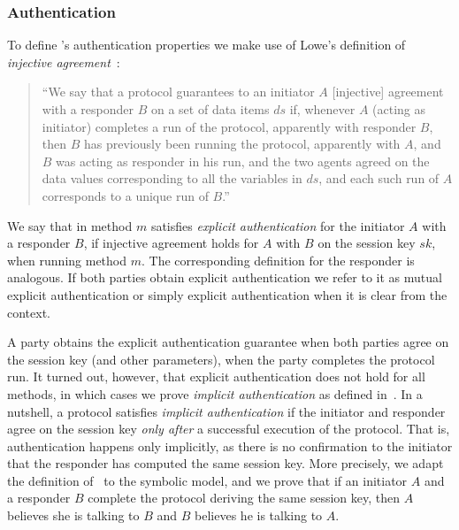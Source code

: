 \spacehack
\subsubsection{Authentication}
To define \mEdhoc{}'s authentication properties we make use of Lowe's definition
of \emph{injective agreement}~\cite{DBLP:conf/csfw/Lowe97a}:
\begin{quote}
  ``We say that a protocol guarantees to an initiator $A$ [injective] agreement
  with a responder $B$ on a set of data items $ds$ if, whenever $A$ (acting as
  initiator) completes a run of the protocol, apparently with responder $B$,
  then $B$ has previously been running the protocol, apparently with $A$, and
  $B$ was acting as responder in his run, and the two agents agreed on the data
  values corresponding to all the variables in $ds$, and each such run of $A$
  corresponds to a unique run of $B$.''
\end{quote}
%
We say that \mEdhoc{} in method $m$ satisfies \emph{explicit authentication} for
the initiator $A$ with a responder $B$, if injective agreement holds for $A$
with $B$ on the session key $sk$, when running method $m$.
%
The corresponding definition for the responder is analogous.
%
If both parties obtain explicit authentication we refer to it as mutual explicit
authentication or simply explicit authentication when it is clear from the
context.

A party obtains the explicit authentication guarantee when both parties agree
on the session key (and other parameters), when the party completes the protocol
run.
%
It turned out, however, that explicit authentication does not hold for all
\mEdhoc{} methods, in which cases we prove \emph{implicit authentication} as
defined in~\cite{DBLP:journals/iacr/GuilhemFW19}.
%
In a nutshell, a protocol satisfies \emph{implicit authentication} if the
initiator and responder agree on the session key \emph{only after} a successful
execution of the protocol.
%
That is, authentication happens only implicitly, as there is no confirmation to
the initiator that the responder has computed the same session key.
%
More precisely, we adapt the definition of~\cite{DBLP:journals/iacr/GuilhemFW19}
to the symbolic model, and we prove that if an initiator $A$ and a responder $B$
complete the protocol deriving the same session key, then $A$ believes she is
talking to $B$ and $B$ believes he is talking to $A$.

\spacehack
